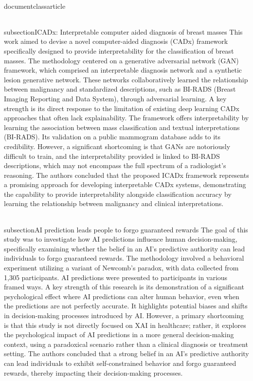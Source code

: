 \\documentclass{article}
\begin{document}
\\subsection{ICADx: Interpretable computer aided diagnosis of breast masses}
This work aimed to devise a novel computer-aided diagnosis (CADx) framework specifically designed to provide interpretability for the classification of breast masses. The methodology centered on a generative adversarial network (GAN) framework, which comprised an interpretable diagnosis network and a synthetic lesion generative network. These networks collaboratively learned the relationship between malignancy and standardized descriptions, such as BI-RADS (Breast Imaging Reporting and Data System), through adversarial learning. A key strength is its direct response to the limitation of existing deep learning CADx approaches that often lack explainability. The framework offers interpretability by learning the association between mass classification and textual interpretations (BI-RADS). Its validation on a public mammogram database adds to its credibility. However, a significant shortcoming is that GANs are notoriously difficult to train, and the interpretability provided is linked to BI-RADS descriptions, which may not encompass the full spectrum of a radiologist's reasoning. The authors concluded that the proposed ICADx framework represents a promising approach for developing interpretable CADx systems, demonstrating the capability to provide interpretability alongside classification accuracy by learning the relationship between malignancy and clinical interpretations.

\\subsection{AI prediction leads people to forgo guaranteed rewards}
The goal of this study was to investigate how AI predictions influence human decision-making, specifically examining whether the belief in an AI's predictive authority can lead individuals to forgo guaranteed rewards. The methodology involved a behavioral experiment utilizing a variant of Newcomb's paradox, with data collected from 1,305 participants. AI predictions were presented to participants in various framed ways. A key strength of this research is its demonstration of a significant psychological effect where AI predictions can alter human behavior, even when the predictions are not perfectly accurate. It highlights potential biases and shifts in decision-making processes introduced by AI. However, a primary shortcoming is that this study is not directly focused on XAI in healthcare; rather, it explores the psychological impact of AI predictions in a more general decision-making context, using a paradoxical scenario rather than a clinical diagnosis or treatment setting. The authors concluded that a strong belief in an AI's predictive authority can lead individuals to exhibit self-constrained behavior and forgo guaranteed rewards, thereby impacting their decision-making processes.
\end{document}
